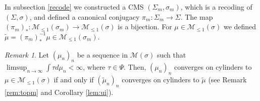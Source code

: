 \documentclass[letterpaper,11pt]{amsart}
\theoremstyle{plain}
\theoremstyle{plain}
\theoremstyle{definition}
\theoremstyle{remark}
\newtheorem{remark}{Remark}[section]
\def\M{{\mathcal M}}
\begin{document}
In subsection \ref{recode} we constructed a CMS $(\Sigma_m,\sigma_m)$, which is a recoding of $(\Sigma,\sigma)$, and defined a canonical conjugacy $\pi_m:\Sigma_m\to\Sigma$. The map $(\pi_m)_*:\M_{\le1}(\sigma_m)\to\M_{\le1}(\sigma)$ is a bijection. For $\mu\in \M_{\le1}(\sigma)$ we defined  $\tilde{\mu}=(\pi_m)^{-1}_*{\mu}\in \M_{\le1}(\sigma_m)$. 

\begin{remark}\label{rem:preclaim} Let $(\mu_n)_n$ be a sequence in $\M(\sigma)$ such that $\limsup_{n\to\infty}\int \tau d\mu_n<\infty$, where $\tau\in \Psi$. Then, $(\mu_n)_n$ converges on cylinders to $\mu\in \M_{\le1}(\sigma)$ if and only if $(\tilde{\mu}_n)_n$ converges on cylinders to $\tilde{\mu}$ (see Remark \ref{rem:topm} and Corollary \ref{lem:ui}).
\end{remark}
\end{document}
